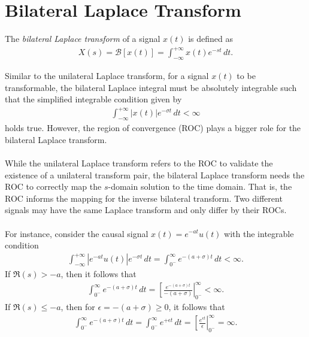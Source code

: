 \documentclass{report}
\begin{document}
\section{Bilateral Laplace Transform}
\begin{tcolorbox}[width=\textwidth,colback={white}, sharp corners]
    The \emph{bilateral Laplace transform} of a signal $x(t)$ is defined as  
    \begin{align}
        X(s) = \mathcal{B}[x(t)] = \int_{-\infty}^{+\infty} x(t) e^{-st} \,dt.
    \end{align}
\end{tcolorbox}
\noindent Similar to the unilateral Laplace transform, for a signal $x(t)$ to be transformable, the bilateral Laplace integral must be absolutely integrable such that 
the simplified integrable condition given by 
\begin{align}
    \int_{-\infty}^{+\infty} |x(t)| e^{-\sigma t} \,dt < \infty
\end{align}
holds true. However, the region of convergence (ROC) plays a bigger role for the bilateral Laplace transform. 
\\ \\ 
While the unilateral Laplace transform refers to the ROC 
to validate the existence of a unilateral transform pair, the bilateral Laplace transform needs the ROC to correctly map the $s$-domain solution to the time domain. 
That is, the ROC informs the mapping for the inverse bilateral transform. Two different signals may have the same Laplace transform and only differ by their ROCs. 
\\ \\
For instance, consider the causal signal $x(t)=e^{-at}u(t)$ with the integrable condition
\begin{align*}
    \int_{-\infty}^{+\infty} |e^{-at}u(t)| e^{-\sigma t} \,dt = \int_{0^-}^{\infty} e^{-(a+\sigma) t} \,dt < \infty.
\end{align*}
If $\Re(s) > -a$, then it follows that 
\begin{align*}
    \int_{0^-}^{\infty} e^{-(a+\sigma) t} \,dt = \left[\frac{e^{-(a+\sigma) t}}{-(a+\sigma)}\right|_{0^-}^{\infty} < \infty.
\end{align*}
If $\Re(s) \leq -a$, then for $\epsilon=-(a+\sigma)\geq 0$, it follows that
\begin{align*}
    \int_{0^-}^{\infty} e^{-(a+\sigma) t} \,dt = \int_{0^-}^{\infty} e^{+\epsilon t} \,dt = \left[\frac{e^{\epsilon t}}{\epsilon}\right|_{0^-}^{\infty} = \infty.
\end{align*}
\end{document}

